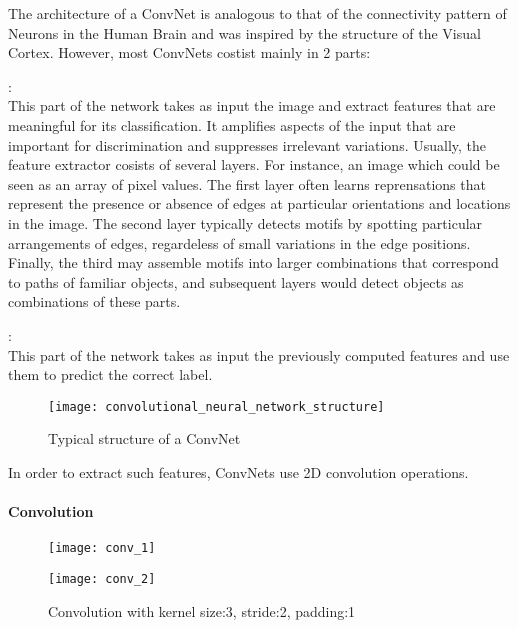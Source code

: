 \documentclass{report}
\begin{document}
The architecture of a ConvNet is analogous to that of the connectivity pattern of Neurons in the Human Brain and was inspired by the
structure of the Visual Cortex. However, most ConvNets costist mainly in 2 parts:
\begin{description}[font=$\bullet$\scshape\bfseries]
\item [ Feature extractor] : \\
  This part of the network takes as input the image and extract features that are meaningful for its classification. It amplifies aspects
  of the input that are important for discrimination and suppresses irrelevant variations. Usually, the feature extractor cosists of
  several layers. For instance, an image which could be seen as an array of pixel values. The first layer often learns reprensations
  that represent the presence or absence of edges at particular orientations and locations in the image. The second layer typically
  detects motifs by spotting particular arrangements of edges, regardeless of small variations in the edge positions. Finally, the third
  may assemble motifs into larger combinations that correspond to paths of familiar objects, and subsequent layers would detect objects
  as combinations of these parts.
  
\item [ Classifier ] : \\
  This part of the network takes as input the previously computed features and use them to predict the correct label.
\end{description}

\begin{figure}[h]
  \centering
  \texttt{[image: convolutional\_neural\_network\_structure]}
  \caption{Typical structure of a ConvNet}
\end{figure}

In order to extract such features, ConvNets use 2D convolution operations.

\paragraph{Convolution}
\begin{figure}[h]
  \centering
  \begin{minipage}[b]{0.4\textwidth}
    \texttt{[image: conv\_1]}
  \end{minipage}
  \hfill
  \begin{minipage}[b]{0.4\textwidth}
    \texttt{[image: conv\_2]}
  \end{minipage}
  \caption{Convolution with kernel size:3, stride:2, padding:1}

\end{figure}
\end{document}
